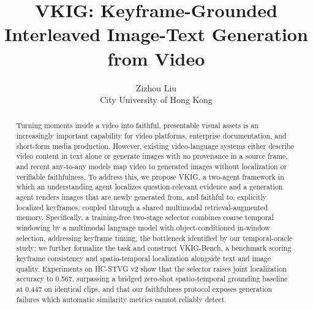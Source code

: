 %

\title{VKIG: Keyframe-Grounded Interleaved Image-Text Generation from Video}
\author{Zizhou Liu\\City University of Hong Kong}
\date{}

\maketitle

\begin{abstract}
Turning moments inside a video into faithful, presentable visual assets is an
increasingly important capability for video platforms, enterprise
documentation, and short-form media production.
However, existing video-language systems either describe video content in text
alone or generate images with no provenance in a source frame, and recent
any-to-any models map video to generated images without localization or
verifiable faithfulness.
To address this, we propose VKIG, a two-agent framework in which an
understanding agent localizes question-relevant evidence and a generation
agent renders images that are newly generated from, and faithful to,
explicitly localized keyframes, coupled through a shared multimodal
retrieval-augmented memory.
Specifically, a training-free two-stage selector combines coarse temporal
windowing by a multimodal language model with object-conditioned in-window
selection, addressing keyframe timing, the bottleneck identified by our
temporal-oracle study; we further formalize the task and construct
VKIG-Bench, a benchmark scoring keyframe consistency and spatio-temporal
localization alongside text and image quality.
Experiments on HC-STVG v2 show that the selector raises joint localization
accuracy to 0.567, surpassing a bridged zero-shot spatio-temporal grounding
baseline at 0.447 on identical clips, and that our faithfulness protocol
exposes generation failures which automatic similarity metrics cannot
reliably detect.
\end{abstract}


